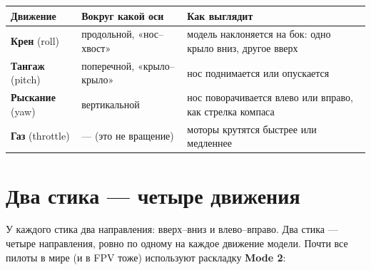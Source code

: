 \begin{center}\small
\renewcommand{\arraystretch}{1.3}
\begin{tabularx}{\linewidth}{@{}>{\raggedright\arraybackslash}p{26mm}>{\raggedright\arraybackslash}p{40mm}X@{}}
\toprule
\textbf{Движение} & \textbf{Вокруг какой оси} & \textbf{Как выглядит} \\
\midrule
\textbf{Крен} (roll) & продольной, «нос--хвост» & модель наклоняется на бок: одно крыло вниз, другое вверх \\
\textbf{Тангаж} (pitch) & поперечной, «крыло--крыло» & нос поднимается или опускается \\
\textbf{Рыскание} (yaw) & вертикальной & нос поворачивается влево или вправо, как стрелка компаса \\
\textbf{Газ} (throttle) & --- (это не вращение) & моторы крутятся быстрее или медленнее \\
\bottomrule
\end{tabularx}
\end{center}

\section{Два стика --- четыре движения}

У каждого стика два направления: вверх--вниз и влево--вправо. Два стика --- четыре направления,
ровно по одному на каждое движение модели. Почти все пилоты в мире (и в FPV тоже) используют
раскладку \textbf{Mode 2}:


